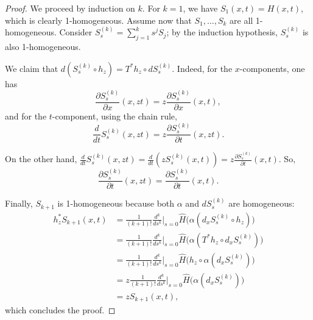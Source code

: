 \documentclass[10pt,a4paper]{amsart}
\begin{document}
\begin{proof}
    We proceed by induction on $k$. For $k=1$, we have $S_1(x,t) = H(x,t)$, which is clearly 1-homogeneous. Assume now that $S_1, \dots, S_k$ are all 1-homogeneous. Consider $S_s^{(k)} = \sum_{j=1}^k s^j S_j$; by the induction hypothesis, $S_s^{(k)}$ is also 1-homogeneous.  

We claim that $d(S_s^{(k)} \circ h_z) = T^*h_z \circ d S_s^{(k)}$. Indeed, for the $x$-components, one has
\[
    \frac{\partial S_s^{(k)}}{\partial x}(x, zt) = z \frac{\partial S_s^{(k)}}{\partial x}(x, t),
\]
and for the $t$-component, using the chain rule,
\[
    \frac{d}{dt}S_s^{(k)} (x,zt) = z \frac{\partial S^{(k)}_s}{\partial t}(x,zt). 
\]

On the other hand, $\frac{d}{dt}S_s^{(k)} (x,zt) = \frac{d}{dt}\left(zS_s^{(k)} (x,t) \right) = z \frac{\partial S^{(k)}_s}{\partial t}(x,t)$. So,
\[\frac{\partial S_s^{(k)}}{\partial t} (x,zt) =\frac{\partial S_s^{(k)}}{\partial t} (x,t).\]
        

Finally, $S_{k+1}$ is 1-homogeneous because both $\alpha$ and $dS_s^{(k)}$ are homogeneous:
\begin{align*}
    h_z^* S_{k+1}(x,t) &= \frac{1}{(k+1)!} \frac{d^k}{ds^k}\Big|_{s=0} \hat{H}\Big( \alpha(d_x S_s^{(k)} \circ h_z) \Big)\\
    &= \frac{1}{(k+1)!} \frac{d^k}{ds^k}\Big|_{s=0} \hat{H}\Big( \alpha(T^*h_z \circ d_x S_s^{(k)}) \Big)\\
    &= \frac{1}{(k+1)!} \frac{d^k}{ds^k}\Big|_{s=0} \hat{H}\Big( h_z \circ \alpha(d_x S_s^{(k)}) \Big)\\
    &= z \frac{1}{(k+1)!} \frac{d^k}{ds^k}\Big|_{s=0} \hat{H}\Big( \alpha(d_x S_s^{(k)}) \Big)\\
    &= z S_{k+1}(x,t), 
\end{align*}
which concludes the proof.
\end{proof} 
\end{document}
